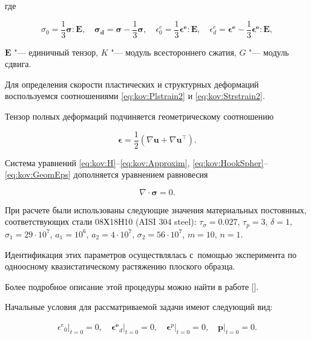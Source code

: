 где 

$$\sigma_{0}=\frac{1}{3}\boldsymbol{\sigma}:\boldsymbol{E},\quad \boldsymbol{\sigma_{d}}=\boldsymbol{\sigma}-\frac{1}{3}\boldsymbol{\sigma},\quad  

\epsilon^{e}_{0}=\frac{1}{3}\boldsymbol{\epsilon^{e}}:\boldsymbol{E},\quad 

\epsilon^{e}_{d}=\boldsymbol{\epsilon^{e}}-\frac{1}{3}\boldsymbol{\epsilon^{e}}:\boldsymbol{E},$$ 

$\boldsymbol{E}$ "--- единичный тензор, $K$ "--- модуль всестороннего сжатия, $G$ "---  модуль сдвига.

Для определения скорости пластических и структурных деформаций воспользуемся соотношениями \eqref{eq:kov:Plstrain2} и \eqref{eq:kov:Strstrain2}.

Тензор полных деформаций подчиняется геометрическому соотношению

\begin{equation} 

\boldsymbol{\epsilon}=\frac{1}{2}(\nabla \boldsymbol{u}+\nabla \boldsymbol{u}^{\top}). \label{eq:kov:GeomEps}

\end{equation}

Система уравнений \eqref{eq:kov:H}--\eqref{eq:kov:Approxim}, \eqref{eq:kov:HookSpher}--\eqref{eq:kov:GeomEps} дополняется уравнением равновесия

$$

\nabla \cdot \boldsymbol{\sigma}=0.

$$



При расчете были использованы следующие значения материальных постоянных, соответствующих стали 08Х18Н10 (AISI 304 steel): $\tau_{\sigma}=0.027$, ${\tau_{p}=3}$, $\delta=1$, $\sigma_{1}=29\cdot 10^7$, $a_{1}=10^6$, $a_{2}=4\cdot10^7$, $\sigma_{2}=56\cdot10^7$, $m=10$, $n=1$.

Идентификация этих параметров осуществлялась  с~помощью эксперимента по одноосному квазистатическому растяжению плоского образца. 

Более подробное описание этой процедуры можно найти в работе [].



Начальные условия для рассматриваемой задачи имеют следующий вид:

\begin{gather*}

{\epsilon^{e}}_{0}\big|_{t=0}=0,\quad 

\boldsymbol{{\epsilon}^{e}}_{d}\big|_{t=0}=0,\quad 

\boldsymbol{\epsilon}^{p}\big|_{t=0}=0,\quad 

\boldsymbol{p}\big|_{t=0}=0.

\end{gather*}

